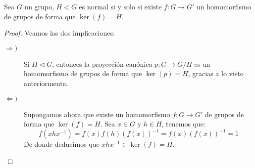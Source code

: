 \begin{prop}
    Sea $G$ un grupo, $H<G$ es normal si y solo si existe $f:G\to G'$ un homomorfismo de grupos de forma que $\ker(f) = H$.
    \begin{proof}
        Veamos las dos implicaciones:
        \begin{description}
            \item [$\Longrightarrow)$] Si $H\lhd G$, entonces la proyección canónica $p:G\to G/H$ es un homomorfismo de grupos de forma que $\ker(p) = H$, gracias a lo visto anteriormente.
            \item [$\Longleftarrow)$] Supongamos ahora que existe un homomorfismo $f:G\to G'$ de grupos de forma que $\ker(f) = H$. Sea $x\in G$ y $h\in H$, tenemos que:
                \begin{equation*}
                    f(xhx^{-1}) = f(x)f(h){(f(x))}^{-1} = f(x) {(f(x))}^{-1} = 1
                \end{equation*}
                De donde deducimos que $xhx^{-1}\in \ker(f) = H$.
        \end{description}
    \end{proof}
\end{prop}

